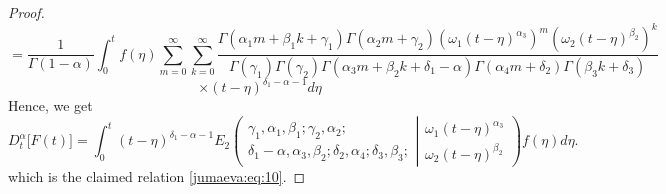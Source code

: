 \documentclass{amsart}
\numberwithin{equation}{section}
\begin{document}
\begin{proof}
\begin{equation*}
    =\frac{1}{\Gamma(1-\alpha)} \int_0^t f(\eta) \sum_{m=0}^\infty \sum_{k=0}^\infty \frac{\Gamma(\alpha_1 m+\beta_1 k+\gamma_1)\Gamma(\alpha_2 m+\gamma_2) (\omega_1(t-\eta)^{\alpha_3})^m (\omega_2(t-\eta)^{\beta_2})^k}{\Gamma(\gamma_1)\Gamma(\gamma_2)\Gamma(\alpha_3 m+\beta_2 k+\delta_1-\alpha)\Gamma(\alpha_4 m+\delta_2)\Gamma(\beta_3 k+ \delta_3)}
\end{equation*}
\begin{equation*}
\times    (t-\eta)^{\delta_1-\alpha-1} d\eta
\end{equation*}
Hence, we get 
\begin{equation*}
   D_t^\alpha\big[F(t)\big]=\int_0^t (t-\eta)^{\delta_1-\alpha-1} E_2\left(\begin{array}{c}
\gamma_1,\alpha_1, \beta_1 ; \gamma_2, \alpha_2 ; \\
\delta_1-\alpha, \alpha_3, \beta_2 ;\delta_2, \alpha_4; \delta_3, \beta_3 ; 
\end{array} \left| 
\begin{array}{c}
\omega_1 (t-\eta)^{\alpha_3} \\
\omega_2 (t-\eta)^{\beta_2} 
\end{array} 
\right.
\right) f(\eta) d\eta.
\end{equation*}
which is the claimed relation \eqref{jumaeva:eq:10}.
\end{proof}
\end{document}
